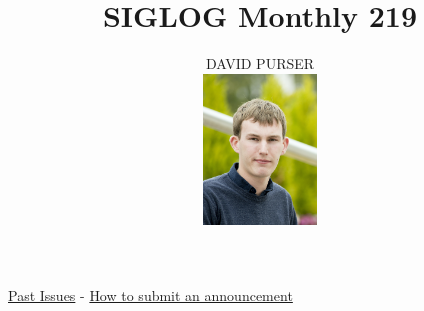 \documentclass[prodmode,acmtecs]{acmsmall} %
\newcounter{colstart}
\begin{document}
\setcounter{colstart}{\thepage}

\title{\huge\sc SIGLOG Monthly 219}
\author{DAVID PURSER
\vspace*{-2.6cm}\begin{flushright}\includegraphics[width=30mm]{dp}\end{flushright}
}

\maketitlee

\href{https://lics.siglog.org/newsletters/}{Past Issues}
 - 
\href{https://lics.siglog.org/newsletters/inst.html}{How to submit an announcement}
\end{document}

